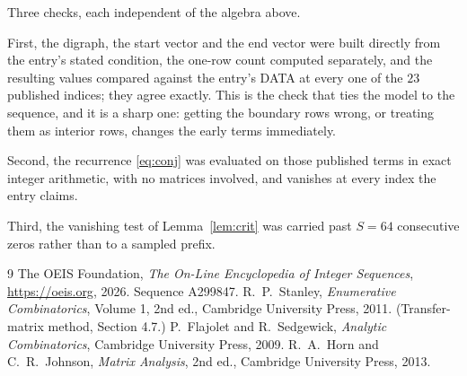 \documentclass[11pt,a4paper]{article}
\theoremstyle{plain}
\theoremstyle{definition}
\begin{document}
Three checks, each independent of the algebra above.

First, the digraph, the start vector and the end vector were built directly from the
entry's stated condition, the one-row count computed separately, and the resulting values
compared against the entry's DATA at every one of the $23$ published indices; they
agree exactly. This is the check that ties the model to the sequence, and it is a sharp one:
getting the boundary rows wrong, or treating them as interior rows, changes the early terms
immediately.

Second, the recurrence \eqref{eq:conj} was evaluated on those published terms in exact
integer arithmetic, with no matrices involved, and vanishes at every index the entry claims.

Third, the vanishing test of Lemma~\ref{lem:crit} was carried past $S=64$ consecutive
zeros rather than to a sampled prefix.

\begin{thebibliography}{9}
 The OEIS Foundation, \emph{The On-Line Encyclopedia of Integer
Sequences}, \url{https://oeis.org}, 2026. Sequence A299847.
 R.~P.~Stanley, \emph{Enumerative Combinatorics}, Volume 1, 2nd ed.,
Cambridge University Press, 2011. (Transfer-matrix method, Section 4.7.)
 P.~Flajolet and R.~Sedgewick, \emph{Analytic Combinatorics}, Cambridge
University Press, 2009.
 R.~A.~Horn and C.~R.~Johnson, \emph{Matrix Analysis}, 2nd ed., Cambridge
University Press, 2013.
\end{thebibliography}
\end{document}
